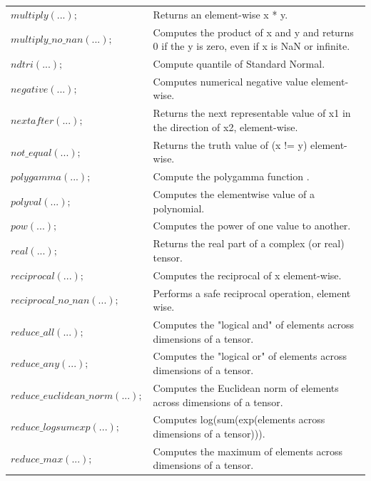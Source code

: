 \documentclass[12pt]{report}
\begin{document}
\begin{longtable}{ p{} | p{}}
$multiply(...);$ & Returns an element-wise x * y. \\ 

$multiply\_no\_nan(...);$ & Computes the product of x and y and returns 0 if the y is zero, even if x is NaN or infinite. \\ 

$ndtri(...);$ & Compute quantile of Standard Normal. \\ 

$negative(...);$ & Computes numerical negative value element-wise. \\ 

$nextafter(...);$ & Returns the next representable value of x1 in the direction of x2, element-wise. \\ 

$not\_equal(...);$ & Returns the truth value of (x != y) element-wise. \\ 

$polygamma(...);$ & Compute the polygamma function . \\ 

$polyval(...);$ & Computes the elementwise value of a polynomial. \\ 

$pow(...);$ & Computes the power of one value to another. \\ 

$real(...);$ & Returns the real part of a complex (or real) tensor. \\ 

$reciprocal(...);$ & Computes the reciprocal of x element-wise. \\ 

$reciprocal\_no\_nan(...);$ & Performs a safe reciprocal operation, element wise. \\ 

$reduce\_all(...);$ & Computes the "logical and" of elements across dimensions of a tensor. \\ 

$reduce\_any(...);$ & Computes the "logical or" of elements across dimensions of a tensor. \\ 

$reduce\_euclidean\_norm(...);$ & Computes the Euclidean norm of elements across dimensions of a tensor. \\ 

$reduce\_logsumexp(...);$ & Computes log(sum(exp(elements across dimensions of a tensor))). \\ 

$reduce\_max(...);$ & Computes the maximum of elements across dimensions of a tensor. \\ 


\end{longtable}
\end{document}
